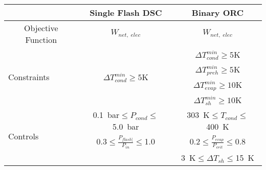 \begin{tabular}{|c | c c |}
    \hline
    \rowcolor{bluepoli!40} %
      & \textbf{Single Flash DSC} & \textbf{Binary ORC} \T\B \\
    \hline \hline
    Objective Function & \(W_{net,\;elec}\) & \(W_{net,\;elec}\) \T\B \\
    \hline
    \multicolumn{1}{|l|}{\multirow{4}{*}{Constraints}} & \multirow{4}{*}{\(\Delta T_{cond}^{min}\geq5\)\unit{\K}} & \(\Delta T_{cond}^{min}\geq5\)\unit{\K} \T\B \\
    \multicolumn{1}{|l|}{} &  & \(\Delta T_{preh}^{min}\geq5\)\unit{\K} \T\B \\
    \multicolumn{1}{|l|}{} &  & \(\Delta T_{evap}^{min}\geq10\)\unit{\K} \T\B \\
    \multicolumn{1}{|l|}{} &  & \(\Delta T_{sh}^{min}\geq10\)\unit{\K} \T\B \\
    \hline
    \multicolumn{1}{|l|}{\multirow{3}{*}{Controls}} & \qty{0.1}{\bar}\(\leq P_{cond}\leq\)\qty{5.0}{\bar} & \qty{303}{\K}\(\leq T_{cond}\leq\)\qty{400}{\K} \T\B \\
    \multicolumn{1}{|l|}{} & \num{0.3}\(\leq \frac{P_{flash]}}{P_{in}}\leq\)\num{1.0} & \num{0.2}\(\leq \frac{P_{evap}}{P_{crit}}\leq\)\num{0.8} \T\B \\
    \multicolumn{1}{|l|}{} &  & \qty{3}{\K}\(\leq \Delta T_{sh}\leq\)\qty{15}{\K} \T\B \\
    \hline
\end{tabular}